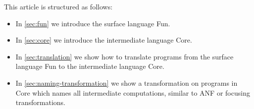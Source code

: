 This article is structured as follows:
\begin{itemize}
    \item In \cref{sec:fun} we introduce the surface language Fun.
    \item In \cref{sec:core} we introduce the intermediate language Core.
    \item In \cref{sec:translation} we show how to translate programs from the surface language Fun to the intermediate language Core.
    \item In \cref{sec:naming-transformation} we show a transformation on programs in Core which names all intermediate computations, similar to ANF or focusing transformations.
\end{itemize}
